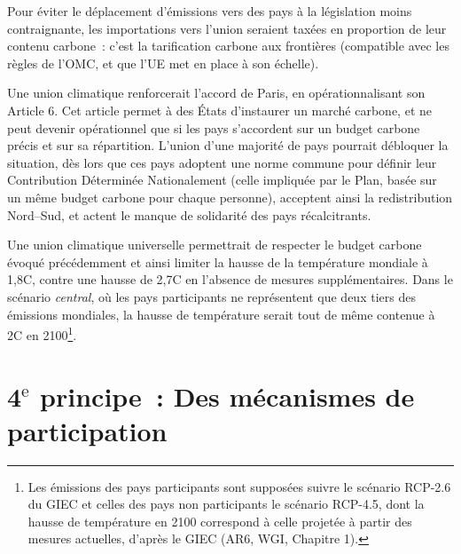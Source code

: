 \documentclass[a5paper,french,openany]{memoir}
\begin{document}

Pour éviter le déplacement d'émissions vers des pays à la législation moins contraignante, les importations vers l'union seraient taxées en proportion de leur contenu carbone~: c'est la tarification carbone aux frontières (compatible avec les règles de l'OMC, et que l'UE met en place à son échelle).

Une union climatique renforcerait l'accord de Paris, en opérationnalisant son Article 6. Cet article permet à des États d'instaurer un marché carbone, et ne peut devenir opérationnel que si les pays s'accordent sur un budget carbone précis et sur sa répartition. L'union d'une majorité de pays pourrait débloquer la situation, dès lors que ces pays adoptent une norme commune pour définir leur Contribution Déterminée Nationalement (celle impliquée par le Plan, basée sur un même budget carbone pour chaque personne), acceptent ainsi la redistribution Nord--Sud, et actent le manque de solidarité des pays récalcitrants. 

Une union climatique universelle permettrait de respecter le budget carbone évoqué précédemment et ainsi limiter la hausse de la température mondiale à 1,8\textdegree{}C, contre une hausse de 2,7\textdegree{}C en l'absence de mesures supplémentaires. Dans le scénario \textit{central}, où les pays participants ne représentent que deux tiers des émissions mondiales, la hausse de température serait tout de même contenue à 2\textdegree{}C en 2100\footnote{Les émissions des pays participants sont supposées suivre le scénario RCP-2.6 du GIEC et celles des pays non participants le scénario RCP-4.5, dont la hausse de température en 2100 correspond à celle projetée à partir des mesures actuelles, d'après le GIEC (AR6, WGI, Chapitre 1).}.%

\section{4$^\text{e}$ principe~: Des mécanismes de participation}
\end{document}
